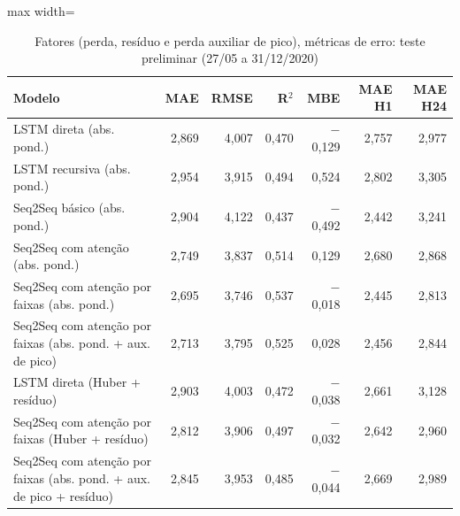 \begin{table}[!htbp]
    \centering
    \caption{Fatores (perda, resíduo e perda auxiliar de pico), métricas de erro: teste preliminar (27/05 a 31/12/2020)}
    \label{tab:metricas_fatores_teste_historico}
    \small
    \begin{adjustbox}{max width=\textwidth}
    \begin{tabular}{>{\raggedright\arraybackslash}p{}rrrrrr}
        \toprule
        Modelo & MAE & RMSE & R$^2$ & MBE & MAE H1 & MAE H24 \\
        \midrule
        LSTM direta (abs. pond.) & 2,869 & 4,007 & 0,470 & $-$0,129 & 2,757 & 2,977 \\
        LSTM recursiva (abs. pond.) & 2,954 & 3,915 & 0,494 & 0,524 & 2,802 & 3,305 \\
        Seq2Seq básico (abs. pond.) & 2,904 & 4,122 & 0,437 & $-$0,492 & 2,442 & 3,241 \\
        Seq2Seq com atenção (abs. pond.) & 2,749 & 3,837 & 0,514 & 0,129 & 2,680 & 2,868 \\
        Seq2Seq com atenção por faixas (abs. pond.) & 2,695 & 3,746 & 0,537 & $-$0,018 & 2,445 & 2,813 \\
        Seq2Seq com atenção por faixas (abs. pond. + aux. de pico) & 2,713 & 3,795 & 0,525 & 0,028 & 2,456 & 2,844 \\
        LSTM direta (Huber + resíduo) & 2,903 & 4,003 & 0,472 & $-$0,038 & 2,661 & 3,128 \\
        Seq2Seq com atenção por faixas (Huber + resíduo) & 2,812 & 3,906 & 0,497 & $-$0,032 & 2,642 & 2,960 \\
        Seq2Seq com atenção por faixas (abs. pond. + aux. de pico + resíduo) & 2,845 & 3,953 & 0,485 & $-$0,044 & 2,669 & 2,989 \\
        \bottomrule
    \end{tabular}
    \end{adjustbox}
\end{table}
